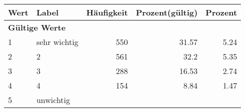      \begin{longtable}{lXrrr}
     \toprule
     \textbf{Wert} & \textbf{Label} & \textbf{Häufigkeit} & \textbf{Prozent(gültig)} & \textbf{Prozent} \\
     \endhead
     \midrule
     \multicolumn{5}{l}{\textbf{Gültige Werte}}\\

     1 &
     \multicolumn{1}{X}{ sehr wichtig   } &


       \num{550} &
       \num[round-mode=places,round-precision=2]{31,57} &
         \num[round-mode=places,round-precision=2]{5,24} \\

     2 &
     \multicolumn{1}{X}{ 2   } &


       \num{561} &
       \num[round-mode=places,round-precision=2]{32,2} &
         \num[round-mode=places,round-precision=2]{5,35} \\

     3 &
     \multicolumn{1}{X}{ 3   } &


       \num{288} &
       \num[round-mode=places,round-precision=2]{16,53} &
         \num[round-mode=places,round-precision=2]{2,74} \\

     4 &
     \multicolumn{1}{X}{ 4   } &


       \num{154} &
       \num[round-mode=places,round-precision=2]{8,84} &
         \num[round-mode=places,round-precision=2]{1,47} \\

     5 &
     \multicolumn{1}{X}{ unwichtig   } &



\end{longtable}

